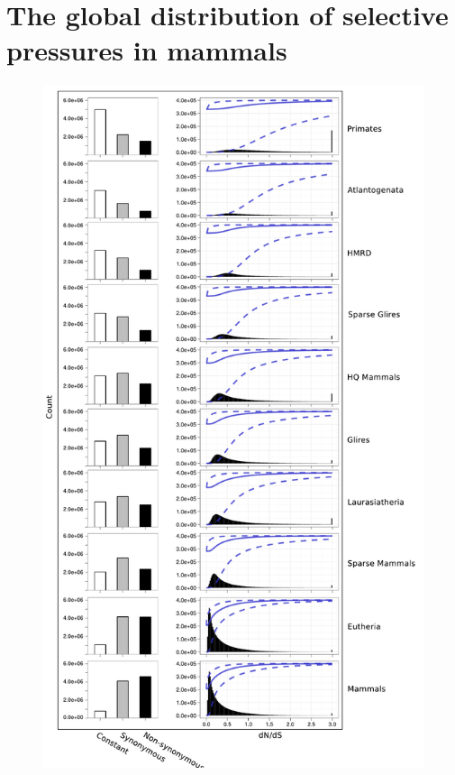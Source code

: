 \section[The global distribution of \sw selective pressures in mammals]{The global distribution of \sw selective \\ pressures in mammals}

\begin{figure}
\centering \includegraphics[scale=0.42]{Figs/global_distributions.pdf}

\end{figure}
